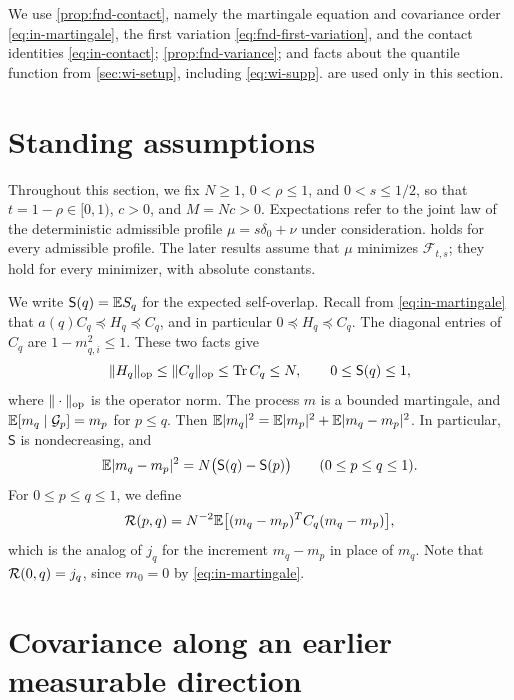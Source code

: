 We use \cref{prop:fnd-contact}, namely the martingale equation and
covariance order \eqref{eq:in-martingale}, the first variation
\eqref{eq:fnd-first-variation}, and the contact identities
\eqref{eq:in-contact}; \cref{prop:fnd-variance}; and facts about the
quantile function from \cref{sec:wi-setup}, including
\eqref{eq:wi-supp}.  are used
only in this section.

\section{Standing assumptions}\label{sec:th-setup}

Throughout this section, we fix $N\ge1$, $0<\rho\le1$, and $0<s\le1/2$,
so that $t=1-\rho\in[0,1)$, $c>0$, and $M=Nc>0$. Expectations refer to the joint law of the
deterministic admissible profile $\mu=s\delta_0+\nu$ under
consideration.  holds for every admissible profile.
The later results assume that $\mu$ minimizes $\mathcal F_{t,s}$; they
hold for every minimizer, with absolute constants.

We write $\mathsf S(q)=\mathbb E S_q$ for the expected self-overlap. Recall
from \eqref{eq:in-martingale} that $a(q)C_q\preceq H_q\preceq C_q$, and
in particular $0\preceq H_q\preceq C_q$. The diagonal entries of $C_q$
are $1-m_{q,i}^2\le1$. These two facts give
\begin{equation}\label{eq:th-op}
 \|H_q\|_{\rm op}\le\|C_q\|_{\rm op}\le\operatorname{Tr} C_q\le N,\qquad
 0\le\mathsf S(q)\le1,
\end{equation}
where $\|\cdot\|_{\rm op}$ is the operator norm. The process $m$ is a
bounded martingale, and $\mathbb E[m_q\mid\mathcal G_p]=m_p$ for $p\le q$. Then
$\mathbb E|m_q|^2=\mathbb E|m_p|^2+\mathbb E|m_q-m_p|^2$. In particular, $\mathsf S$ is
nondecreasing, and
\begin{equation}\label{eq:th-orth}
 \mathbb E|m_q-m_p|^2=N\bigl(\mathsf S(q)-\mathsf S(p)\bigr)
 \qquad(0\le p\le q\le1).
\end{equation}
For $0\le p\le q\le1$, we define
\[
 \mathcal R(p,q)=N^{-2}\mathbb E\bigl[(m_q-m_p)^TC_q(m_q-m_p)\bigr],
\]
which is the analog of $j_q$ for the increment $m_q-m_p$ in place of
$m_q$. Note that $\mathcal R(0,q)=j_q$, since $m_0=0$ by
\eqref{eq:in-martingale}.

\section{Covariance along an earlier measurable direction}\label{sec:th-decay}

